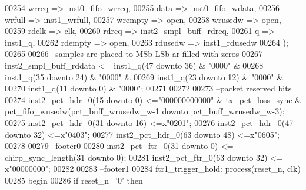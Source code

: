 \begin{DoxyCode}
00254       wrreq          => inst0_fifo_wrreq,
00255       data           => inst0_fifo_wdata,
00256       wrfull         => inst1_wrfull,
00257       wrempty        => \textcolor{keywordflow}{open},
00258       wrusedw        => \textcolor{keywordflow}{open},
00259       rdclk          => clk,
00260       rdreq          => inst2_smpl_buff_rdreq,
00261       q              => inst1_q,
00262       rdempty        => \textcolor{keywordflow}{open},
00263       rdusedw        => inst1_rdusedw  
00264         \textcolor{vhdlchar}{)};
00265  
00266 \textcolor{keyword}{--samples are placed to MSb LSb ar filled with zeros }
00267 inst2\_smpl\_buff\_rddata <=  inst1\_q(\textcolor{vhdllogic}{47} \textcolor{keywordflow}{downto} \textcolor{vhdllogic}{36}) & "\textcolor{vhdllogic}{0000}" & 
00268                            inst1\_q(\textcolor{vhdllogic}{35} \textcolor{keywordflow}{downto} \textcolor{vhdllogic}{24}) & "\textcolor{vhdllogic}{0000}" & 
00269                            inst1\_q(\textcolor{vhdllogic}{23} \textcolor{keywordflow}{downto} \textcolor{vhdllogic}{12}) & "\textcolor{vhdllogic}{0000}" & 
00270                            inst1\_q(\textcolor{vhdllogic}{11} \textcolor{keywordflow}{downto} \textcolor{vhdllogic}{0}) & "\textcolor{vhdllogic}{0000}";
00271     
00272     
00273 \textcolor{keyword}{--packet reserved bits  }
00274   inst2\_pct\_hdr\_0(\textcolor{vhdllogic}{15} \textcolor{keywordflow}{downto} \textcolor{vhdllogic}{0})   <="000000000000" & tx\_pct\_loss\_sync & pct\_fifo\_wusedw(pct\_buff\_wrusedw\_w-1
       \textcolor{keywordflow}{downto} pct\_buff\_wrusedw\_w-3);
00275   inst2\_pct\_hdr\_0(\textcolor{vhdllogic}{31} \textcolor{keywordflow}{downto} \textcolor{vhdllogic}{16})  <=x"0201";
00276   inst2\_pct\_hdr\_0(\textcolor{vhdllogic}{47} \textcolor{keywordflow}{downto} \textcolor{vhdllogic}{32})  <=x"0403";
00277   inst2\_pct\_hdr\_0(\textcolor{vhdllogic}{63} \textcolor{keywordflow}{downto} \textcolor{vhdllogic}{48})  <=x"0605";
00278         
00279 \textcolor{keyword}{--footer0}
00280   inst2\_pct\_ftr\_0(\textcolor{vhdllogic}{31} \textcolor{keywordflow}{downto} \textcolor{vhdllogic}{0})  <= chirp\_sync\_length(\textcolor{vhdllogic}{31} \textcolor{keywordflow}{downto} \textcolor{vhdllogic}{0});
00281   inst2\_pct\_ftr\_0(\textcolor{vhdllogic}{63} \textcolor{keywordflow}{downto} \textcolor{vhdllogic}{32}) <= x"00000000";
00282   
00283 \textcolor{keyword}{--footer1}
00284     ftr1\_trigger\_hold: \textcolor{keywordflow}{process}(reset_n, clk)
00285 \textcolor{vhdlkeyword}{    begin}
00286         \textcolor{keywordflow}{if} \textcolor{vhdlchar}{reset_n}\textcolor{vhdlchar}{=}\textcolor{vhdlchar}{'}\textcolor{vhdllogic}{}\textcolor{vhdllogic}{0}\textcolor{vhdlchar}{'} \textcolor{keywordflow}{then}

\end{DoxyCode}
